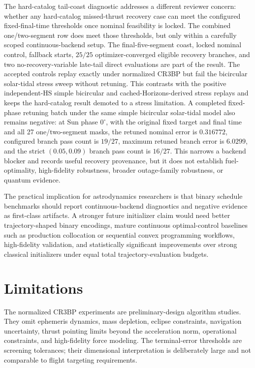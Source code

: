 \documentclass[preprint,12pt]{elsarticle}
\begin{document}
The hard-catalog tail-coast diagnostic addresses a different reviewer concern: whether any hard-catalog missed-thrust recovery case can meet the configured fixed-final-time thresholds once nominal feasibility is locked. The combined one/two-segment row does meet those thresholds, but only within a carefully scoped continuous-backend setup. The final-five-segment coast, locked nominal control, fallback starts, $25/25$ optimizer-converged eligible recovery branches, and two no-recovery-variable late-tail direct evaluations are part of the result. The accepted controls replay exactly under normalized CR3BP but fail the bicircular solar-tidal stress sweep without retuning. This contrasts with the positive independent-HS simple bicircular and cached-Horizons-derived stress replays and keeps the hard-catalog result demoted to a stress limitation. A completed fixed-phase retuning batch under the same simple bicircular solar-tidal model also remains negative: at Sun phase $0^\circ$, with the original fixed target and final time and all 27 one/two-segment masks, the retuned nominal error is $0.316772$, configured branch pass count is $19/27$, maximum retuned branch error is $6.0299$, and the strict $(0.05,0.09)$ branch pass count is $16/27$. This narrows a backend blocker and records useful recovery provenance, but it does not establish fuel-optimality, high-fidelity robustness, broader outage-family robustness, or quantum evidence.

The practical implication for astrodynamics researchers is that binary schedule benchmarks should report continuous-backend diagnostics and negative evidence as first-class artifacts. A stronger future initializer claim would need better trajectory-shaped binary encodings, mature continuous optimal-control baselines such as production collocation or sequential convex programming workflows, high-fidelity validation, and statistically significant improvements over strong classical initializers under equal total trajectory-evaluation budgets.

\section{Limitations}

The normalized CR3BP experiments are preliminary-design algorithm studies. They omit ephemeris dynamics, mass depletion, eclipse constraints, navigation uncertainty, thrust pointing limits beyond the acceleration norm, operational constraints, and high-fidelity force modeling. The terminal-error thresholds are screening tolerances; their dimensional interpretation is deliberately large and not comparable to flight targeting requirements.
\end{document}

